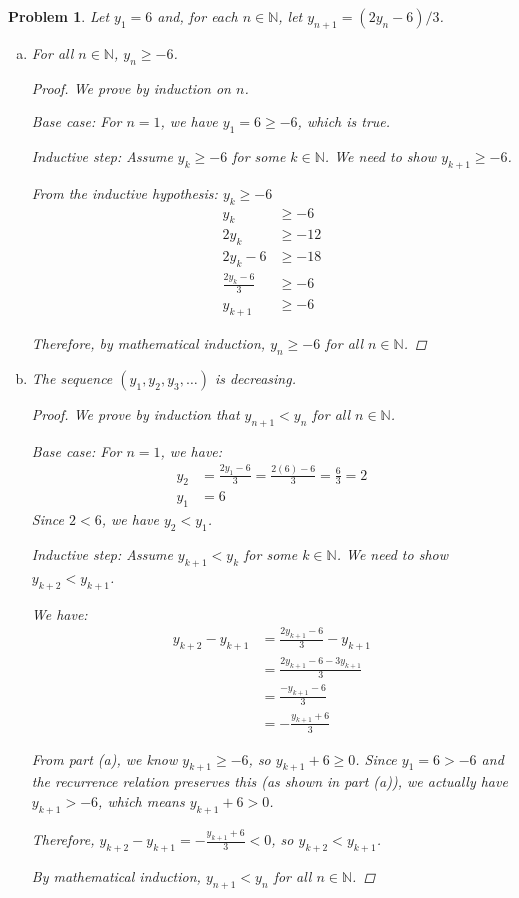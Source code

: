 \documentclass[12pt]{article}
\newtheorem{problem}{Problem}
\newcommand{\NN}{\ensuremath{\mathbb N}}
\begin{document}
\begin{problem} %
Let $y_1=6$ and, for each $n\in\NN$, let $y_{n+1} = (2 y_n - 6) / 3$.
 
\begin{enumerate}[(a)]
\item For all $n\in \NN$, $y_n \ge -6$.

\begin{proof}
	We prove by induction on $n$.

Base case: For $n = 1$, we have $y_1 = 6 \ge -6$, which is true.

Inductive step: Assume $y_k \ge -6$ for some $k \in \NN$. We need to show $y_{k+1} \ge -6$.

From the inductive hypothesis: $y_k \ge -6$
\begin{align*}
y_k &\ge -6 \\
2y_k &\ge -12 \\
2y_k - 6 &\ge -18 \\
\frac{2y_k - 6}{3} &\ge -6 \\
y_{k+1} &\ge -6
\end{align*}

Therefore, by mathematical induction, $y_n \ge -6$ for all $n \in \NN$.
\end{proof}

\item The sequence $(y_1,y_2,y_3,\dots)$ is decreasing.

\begin{proof}
We prove by induction that $y_{n+1} < y_n$ for all $n \in \NN$.

Base case: For $n = 1$, we have:
\begin{align*}
y_2 &= \frac{2y_1 - 6}{3} = \frac{2(6) - 6}{3} = \frac{6}{3} = 2 \\
y_1 &= 6
\end{align*}
Since $2 < 6$, we have $y_2 < y_1$.

Inductive step: Assume $y_{k+1} < y_k$ for some $k \in \NN$. We need to show $y_{k+2} < y_{k+1}$.

We have:
\begin{align*}
y_{k+2} - y_{k+1} &= \frac{2y_{k+1} - 6}{3} - y_{k+1} \\
&= \frac{2y_{k+1} - 6 - 3y_{k+1}}{3} \\
&= \frac{-y_{k+1} - 6}{3} \\
&= -\frac{y_{k+1} + 6}{3}
\end{align*}

From part (a), we know $y_{k+1} \geq -6$, so $y_{k+1} + 6 \geq 0$.
Since $y_1 = 6 > -6$ and the recurrence relation preserves this (as shown in part (a)), we actually have $y_{k+1} > -6$, which means $y_{k+1} + 6 > 0$.

Therefore, $y_{k+2} - y_{k+1} = -\frac{y_{k+1} + 6}{3} < 0$, so $y_{k+2} < y_{k+1}$.

By mathematical induction, $y_{n+1} < y_n$ for all $n \in \NN$.

\end{proof}
\end{enumerate}
\end{problem}
\end{document}
